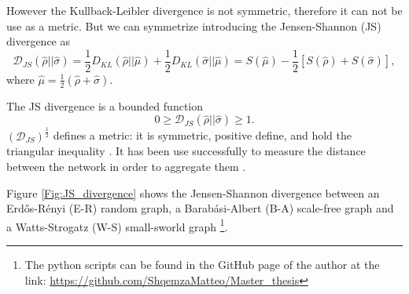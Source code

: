 However the Kullback-Leibler divergence is not symmetric, therefore it can not be use as a metric. 
But we can symmetrize introducing the Jensen-Shannon (JS) divergence \cite{J-S_divergence} as
\begin{equation}\label{JS_metric}
    \mathcal{D}_{JS}(\hat\rho||\hat\sigma) =  \frac{1}{2}D_{KL}(\hat \rho || \hat \mu) + \frac{1}{2}D_{KL}(\hat \sigma || \hat \mu) = S(\hat\mu)-\frac{1}{2}\left[S(\hat\rho) + S(\hat\sigma)\right],
\end{equation}
where $\hat\mu =\frac{1}{2}(\hat\rho+\hat\sigma)$. 

The JS divergence is a bounded function \cite{J-S_divergence}
\begin{equation}
    0 \geq \mathcal{D}_{JS}(\hat\rho||\hat\sigma) \geq 1.
\end{equation}
$\left(\mathcal{D}_{JS}\right)^{\frac{1}{2}}$ defines a metric: it is symmetric, positive define, and hold the triangular inequality \cite{Jensen-Shannon_divergence}. 
It has been use successfully to measure the distance between the network in order to aggregate them \cite{multilayer}.

Figure \ref{Fig:JS_divergence} shows the Jensen-Shannon divergence between an Erd\H{o}s-Rényi (E-R) random graph, a Barab\'asi-Albert (B-A) scale-free graph and a Watts-Strogatz (W-S) small-sworld graph \footnote{The python scripts can be found in the GitHub page of the author at the link: \url{https://github.com/ShqemzaMatteo/Master_thesis}}.

